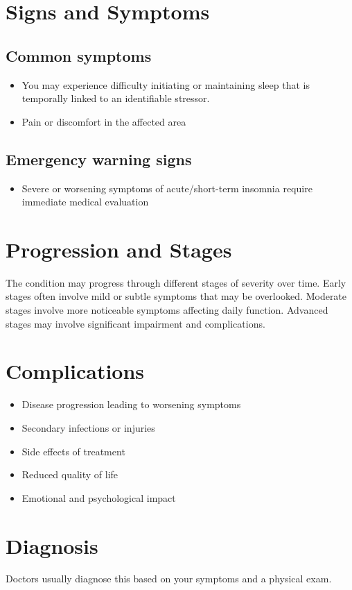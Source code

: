 \section{Signs and Symptoms}
\subsection{Common symptoms}
\begin{itemize}[noitemsep]
  \item You may experience difficulty initiating or maintaining sleep that is temporally linked to an identifiable stressor.
  \item Pain or discomfort in the affected area
  \end{itemize}
\subsection{Emergency warning signs}
\begin{itemize}[noitemsep]
  \item Severe or worsening symptoms of acute/short-term insomnia require immediate medical evaluation
\end{itemize}
\section{Progression and Stages}
The condition may progress through different stages of severity over time. Early stages often involve mild or subtle symptoms that may be overlooked. Moderate stages involve more noticeable symptoms affecting daily function. Advanced stages may involve significant impairment and complications.
\section{Complications}
\begin{itemize}[noitemsep]
  \item Disease progression leading to worsening symptoms
  \item Secondary infections or injuries
  \item Side effects of treatment
  \item Reduced quality of life
  \item Emotional and psychological impact
\end{itemize}
\section{Diagnosis}
Doctors usually diagnose this based on your symptoms and a physical exam.

